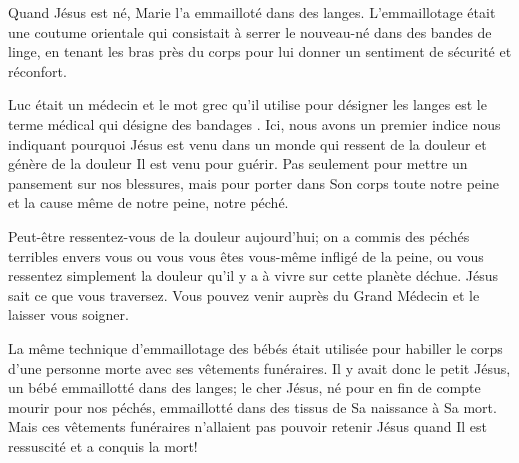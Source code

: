 

Quand Jésus est né, Marie l'a emmailloté dans des langes. L'emmaillotage était une coutume orientale qui consistait à serrer le nouveau-né dans des bandes de linge, en tenant les bras près du corps pour lui donner un sentiment de sécurité et réconfort.

Luc était un médecin et le mot grec qu'il utilise pour désigner les langes est le terme médical qui désigne des \Og bandages \Fg{}. Ici, nous avons un premier indice nous indiquant pourquoi Jésus est venu dans un monde qui ressent de la douleur et génère de la douleur\frcolon{} Il est venu pour guérir. Pas seulement pour mettre un pansement sur nos blessures, mais pour porter dans Son corps toute notre peine et la cause même de notre peine, notre péché.

Peut-être ressentez-vous de la douleur aujourd'hui; on a commis des péchés terribles envers vous ou vous vous êtes vous-même infligé de la peine, ou vous ressentez simplement la douleur qu'il y a à vivre sur cette planète déchue. Jésus sait ce que vous traversez. Vous pouvez venir auprès du Grand Médecin et le laisser vous soigner.

La même technique d'emmaillotage des bébés était utilisée pour habiller le corps d'une personne morte avec ses vêtements funéraires. Il y avait donc le petit Jésus, un bébé emmaillotté dans des langes; le cher Jésus, né pour en fin de compte mourir pour nos péchés, emmaillotté dans des tissus de Sa naissance à Sa mort. Mais ces vêtements funéraires n'allaient pas pouvoir retenir Jésus quand Il est ressuscité et a conquis la mort!


\begin{dvquotes}
\end{dvquotes}
